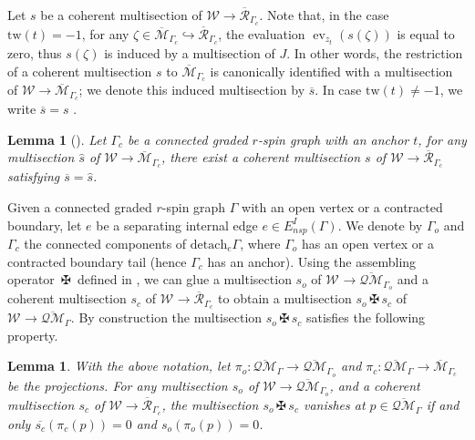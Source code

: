 \documentclass[11pt]{amsart}
\newtheorem{lem}[dummy]{Lemma}
\theoremstyle{definition}
\theoremstyle{remark}
\newcommand{\tw}{\text{tw}}
\newcommand{\Ass}{{{\,\maltese\,}}}
\newcommand{\oQMb}{{\overline{\mathcal{QM}}}}
\newcommand{\<}{\left<}
\renewcommand{\>}{\right>}
\numberwithin{equation}{section}
\def\Mbar{{\overline{\mathcal M}}}
\begin{document}
Let $s$ be a coherent multisection of $\mathcal{W} \rightarrow {\overline{\mathcal{R}}}_{\Gamma_c}$. Note that, in the case $\tw(t)=-1$, for any $\zeta\in\Mbar_{\Gamma_c} \hookrightarrow {\overline{\mathcal{R}}}_{\Gamma_c}$, the evaluation $\operatorname{ev}_{z_t}(s(\zeta))$ is equal %
to zero, thus $s(\zeta)$ %
is induced by a multisection of $J$.  In other words, the restriction of a coherent multisection $s$ to $\Mbar_{\Gamma_c}$ is canonically identified with a multisection of ${\mathcal{W}} \rightarrow \Mbar_{\Gamma_c}$; we denote this induced multisection by $\overline{s}$.  In case $\tw(t)\ne -1$, we write $\overline{s} = s$%
.
\begin{lem}[{\cite[Lemma 2.12]{TZ2}}]
    Let %
$\Gamma_c$ be a connected graded $r$-spin graph with an anchor %
$t$, for any %
multisection $\hat s$ of $\mathcal W\to \Mbar_{\Gamma_c}$,
    there exist a coherent multisection $s$ of $\mathcal W\to {\overline{\mathcal{R}}}_{\Gamma_c}$ satisfying $\overline{s}=\hat s$.
\end{lem}






Given a connected graded $r$-spin graph $\Gamma$ with an open vertex or a contracted boundary, let $e$ be a separating internal edge $e\in E_{nsp}^I(\Gamma)$. We denote by $\Gamma_o$ and $\Gamma_c$ the connected components of ${\text{detach} }_e \Gamma$, where $\Gamma_o$ has an open vertex or a contracted boundary tail (hence $\Gamma_c$ has an anchor). Using the assembling operator $\Ass$ defined in \cite[\S 4.1.3]{BCT2}, we can glue a multisection $s_o$ of $\mathcal W^{}\to \oQMb_{\Gamma_o}$ and a coherent multisection $s_c$ of $\mathcal W^{}\to {\overline{\mathcal{R}}}_{\Gamma_c}$ to obtain a multisection $s_o\Ass s_c$ of $\mathcal W^{}\to \oQMb_{\Gamma}$. %
By construction the %
multisection $s_o\Ass s_c$ satisfies the following property.

\begin{lem} \label{lem zero of assembling}
    With the above notation, let $\pi_o\colon \oQMb_\Gamma \to \oQMb_{\Gamma_o}$ %
and $\pi_c\colon \oQMb_\Gamma \to \Mbar_{\Gamma_c}$ be %
the projections.
    For any multisection $s_o$ of $\mathcal W \to \oQMb_{\Gamma_o}$, and a coherent multisection $s_c$ of $\mathcal W \to \overline{\mathcal R}_{\Gamma_c}$, the multisection $s_o\Ass s_c$ vanishes at $p\in \oQMb_\Gamma$ if and only $\overline{s_c}(\pi_c(p))=0$ and $s_o(\pi_o(p))=0$.
\end{lem}
\end{document}
